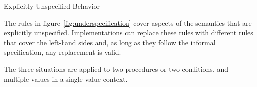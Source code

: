 \beginfig
\begin{center}

\end{center}
\caption{Explicitly Unspecified Behavior}\label{fig:underspecification}
\endfig

The rules in figure~\ref{fig:underspecification} cover aspects of the
semantics that are explicitly unspecified. Implementations can replace
these rules with different rules that cover the left-hand sides and,
as long as they follow the informal specification, any replacement is
valid.

The three situations are  applied to two procedures or
two conditions, and multiple values in a single-value context.

